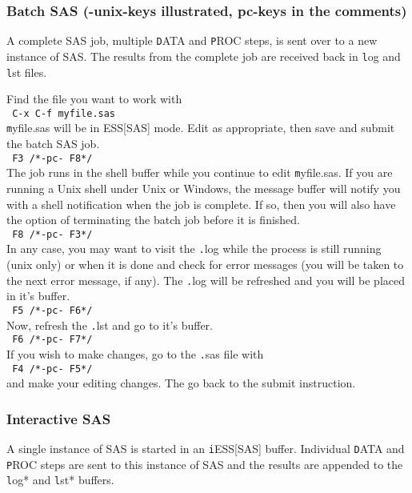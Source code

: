 \documentclass{article}
\newcommand{\elcode}[1]{\\{\texttt{\hspace*{2em} #1}}\\}
\begin{document}
\subsubsection{Batch SAS (-unix-keys illustrated, pc-keys in the comments)}
\label{sec:SAS:batch}
A complete SAS job, multiple {\texttt DATA} and {\texttt PROC} steps,
is sent over to a new instance of SAS.  The results from the complete
job are received back in {\texttt log} and {\texttt lst} files.

Find the file you want to work with
    \elcode{C-x C-f myfile.sas}
{\texttt myfile.sas} will be in ESS[SAS] mode.
Edit as appropriate, then save and submit the batch SAS job.
    \elcode{F3  /*-pc- F8*/}
The job runs in the shell buffer while you continue to edit 
{\texttt myfile.sas}.  If you are running a Unix shell under Unix or
Windows, the message buffer will notify you with a shell
notification when the job is complete.  If so, then you 
will also have the option of terminating the batch job
before it is finished.
    \elcode{F8  /*-pc- F3*/}
In any case, you may want to visit the {\texttt .log} while the process
is still running (unix only) or when it is done and check for
error messages 
(you will be taken to the next error message, if any).
The {\texttt .log} will be refreshed and you will be placed in it's buffer.
    \elcode{F5  /*-pc- F6*/}
Now, refresh the {\texttt .lst} and go to it's buffer.
    \elcode{F6  /*-pc- F7*/}
If you wish to make changes, go to the {\texttt .sas} file with
    \elcode{F4 /*-pc- F5*/}
and make your editing changes.  The go back to the submit instruction.

\subsubsection{Interactive SAS}
A single instance of SAS is started in an {\texttt iESS[SAS]} buffer.  Individual
{\texttt DATA} and {\texttt PROC} steps are sent to this instance of SAS and the results
are appended to the {\texttt *log*} and {\texttt *lst*} buffers.
\end{document}
